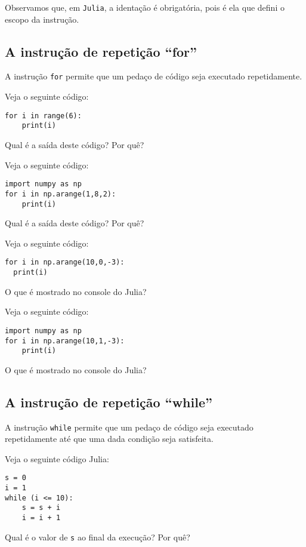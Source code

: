 Observamos que, em \verb+Julia+, a identação é obrigatória, pois é ela que defini o escopo da instrução.

\subsection{A instrução de repetição ``for''}

A instrução \verb+for+ permite que um pedaço de código seja executado repetidamente.

\begin{ex}
  Veja o seguinte código:
\begin{lstlisting}
for i in range(6):
    print(i)
\end{lstlisting}
Qual é a saída deste código? Por quê?
\end{ex}

\begin{ex}
  Veja o seguinte código:
\begin{lstlisting}
import numpy as np
for i in np.arange(1,8,2):
    print(i)
\end{lstlisting}
Qual é a saída deste código? Por quê?
\end{ex}

\begin{ex}
  Veja o seguinte código:
\begin{lstlisting}
for i in np.arange(10,0,-3):
  print(i)
\end{lstlisting}
O que é mostrado no console do Julia?
\end{ex}

\begin{ex}
  Veja o seguinte código:
\begin{lstlisting}
import numpy as np
for i in np.arange(10,1,-3):
    print(i)
\end{lstlisting}
O que é mostrado no console do Julia?
\end{ex}

\subsection{A instrução de repetição ``while''}

A instrução \verb+while+ permite que um pedaço de código seja executado repetidamente até que uma dada condição seja satisfeita.

\begin{ex}
Veja o seguinte código Julia:
\begin{lstlisting}
s = 0
i = 1
while (i <= 10):
    s = s + i
    i = i + 1
\end{lstlisting}
Qual é o valor de \verb+s+ ao final da execução? Por quê?
\end{ex}

